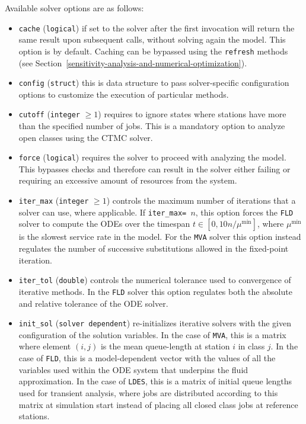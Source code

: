 Available solver options are as follows:
\begin{itemize}
\item \texttt{cache} (\texttt{logical}) if set to  the solver after the first invocation will return the same result upon subsequent calls, without solving again the model. This option is  by default. Caching can be bypassed using the \texttt{refresh} methods (see Section~\ref{sensitivity-analysis-and-numerical-optimization}).
\item \texttt{config} (\texttt{struct}) this is data structure to pass solver-specific configuration options to customize the execution of particular methods.
\item \texttt{cutoff} (\texttt{integer} $\geq 1$) requires to ignore states where stations have more than the specified number of jobs. This is a mandatory option to analyze open classes using the CTMC solver.
\item \texttt{force} (\texttt{logical}) requires the solver to proceed with analyzing the model. This bypasses checks and therefore can result in the solver either failing or requiring an excessive amount of resources from the system.
\item \texttt{iter\_max} (\texttt{integer} $\geq 1$) controls the maximum number of iterations that a solver can use, where applicable. If  \texttt{iter\_max= }$n$, this option forces the \texttt{FLD} solver to compute the ODEs over the timespan $t\in[0,10n/\mu^{\min}]$, where $\mu^{\min}$ is the slowest service rate in the model. For the \texttt{MVA} solver this option instead regulates the number of successive substitutions allowed in the fixed-point iteration.

\item \texttt{iter\_tol} (\texttt{double}) controls the numerical tolerance used to convergence of iterative methods. In the \texttt{FLD} solver this option regulates both the absolute and relative tolerance of the ODE solver.

\item \texttt{init\_sol} (\texttt{solver dependent}) re-initializes iterative solvers with the given configuration of the solution variables. In the case of \texttt{MVA}, this is a matrix where element $(i,j)$ is the mean queue-length at station $i$ in class $j$. In the case of \texttt{FLD}, this is a model-dependent vector with the values of all the variables used within the ODE system that underpins the fluid approximation. In the case of \texttt{LDES}, this is a matrix of initial queue lengths used for transient analysis, where jobs are distributed according to this matrix at simulation start instead of placing all closed class jobs at reference stations.


\end{itemize}
